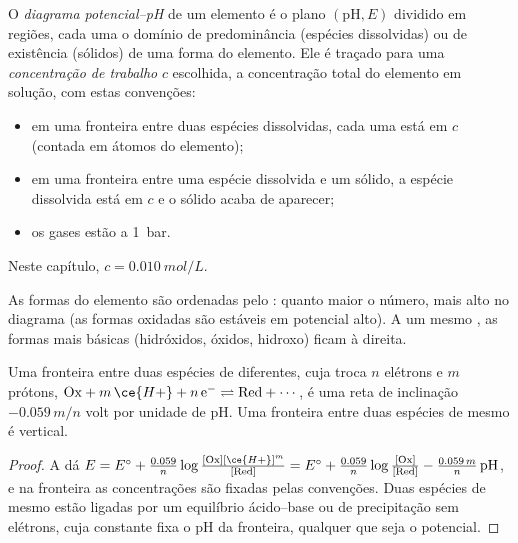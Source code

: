 \begin{definition}\label{def:b1:e-ph-diagrams:e-ph-diagram}
O \emph{diagrama potencial--pH} de um
elemento é o plano $(\mathrm{pH}, E)$ dividido em regiões, cada uma o
domínio de predominância (espécies dissolvidas) ou de existência
(sólidos) de uma forma do elemento. Ele é traçado para uma
\emph{concentração de trabalho} $c$ escolhida, a
concentração total do elemento em solução, com estas convenções:
\begin{itemize}
  \item em uma fronteira entre duas espécies dissolvidas, cada uma está
        em $c$ (contada em átomos do elemento);
  \item em uma fronteira entre uma espécie dissolvida e um sólido, a
        espécie dissolvida está em $c$ e o sólido acaba de aparecer;
  \item os gases estão a \qty{1}{bar}.
\end{itemize}
Neste capítulo, $c = \qty{0.010}{mol/L}$.
\end{definition}

As formas do elemento são ordenadas pelo : quanto
maior o número, mais alto no diagrama (as formas oxidadas são estáveis
em potencial alto). A um mesmo , as formas mais
básicas (hidróxidos, óxidos,  hidroxo) ficam à direita.

\begin{proposition}\label{prop:b1:e-ph-diagrams:boundary-slope}
Uma fronteira entre duas espécies de  diferentes, cuja
 troca $n$ elétrons e $m$ prótons,
$\mathrm{Ox} + m\,\ce{H+} + n\,\mathrm{e^-} \rightleftharpoons \mathrm{Red} +
\cdots$, é uma reta de inclinação $-0.059\,m/n$ volt por unidade de pH.
Uma fronteira entre duas espécies de mesmo  é vertical.
\end{proposition}

\begin{proof}
A  dá $E = E^\circ + \frac{0.059}{n}\log\frac{[\mathrm{Ox}]
[\ce{H+}]^m}{[\mathrm{Red}]} = E^\circ + \frac{0.059}{n}\log\frac{[\mathrm{Ox}]}
{[\mathrm{Red}]} - \frac{0.059\,m}{n}\,\mathrm{pH}$, e na fronteira as
concentrações são fixadas pelas convenções. Duas espécies de mesmo
 estão ligadas por um equilíbrio ácido--base ou de
precipitação sem elétrons, cuja constante fixa o pH da fronteira,
qualquer que seja o potencial.
\end{proof}

